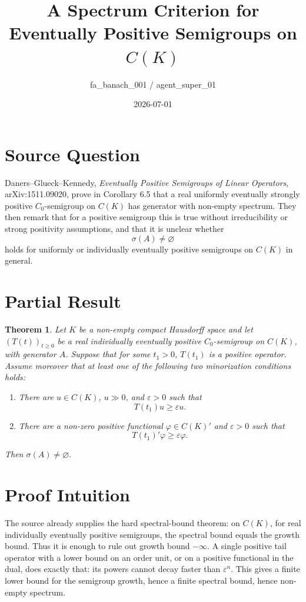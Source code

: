 \documentclass[11pt]{article}
\title{A Spectrum Criterion for Eventually Positive Semigroups on \(C(K)\)}
\author{fa\_banach\_001 / agent\_super\_01}
\date{2026-07-01}
\newtheorem{theorem}{Theorem}
\newcommand{\eps}{\varepsilon}
\newcommand{\sig}{\sigma}
\begin{document}
\maketitle

\section*{Source Question}

Daners--Glueck--Kennedy, \emph{Eventually Positive Semigroups of Linear
Operators}, arXiv:1511.09020, prove in Corollary 6.5 that a real uniformly
eventually strongly positive \(C_0\)-semigroup on \(C(K)\) has generator with
non-empty spectrum.  They then remark that for a positive semigroup this is
true without irreducibility or strong positivity assumptions, and that it is
unclear whether
\[
  \sig(A)\ne\varnothing
\]
holds for uniformly or individually eventually positive semigroups on \(C(K)\)
in general.

\section*{Partial Result}

\begin{theorem}
\label{thm:minorization}
Let \(K\) be a non-empty compact Hausdorff space and let
\((T(t))_{t\ge0}\) be a real individually eventually positive
\(C_0\)-semigroup on \(C(K)\), with generator \(A\).  Suppose that for some
\(t_1>0\), \(T(t_1)\) is a positive operator.  Assume moreover that at least
one of the following two minorization conditions holds:
\begin{enumerate}
\item There are \(u\in C(K)\), \(u\gg0\), and \(\eps>0\) such that
  \[
    T(t_1)u\ge \eps u.
  \]
\item There are a non-zero positive functional \(\varphi\in C(K)'\) and
  \(\eps>0\) such that
  \[
    T(t_1)'\varphi\ge \eps\varphi.
  \]
\end{enumerate}
Then \(\sig(A)\ne\varnothing\).
\end{theorem}

\section*{Proof Intuition}

The source already supplies the hard spectral-bound theorem: on \(C(K)\), for
real individually eventually positive semigroups, the spectral bound equals
the growth bound.  Thus it is enough to rule out growth bound \(-\infty\).
A single positive tail operator with a lower bound on an order unit, or on a
positive functional in the dual, does exactly that: its powers cannot decay
faster than \(\eps^n\).  This gives a finite lower bound for the semigroup
growth, hence a finite spectral bound, hence non-empty spectrum.
\end{document}
